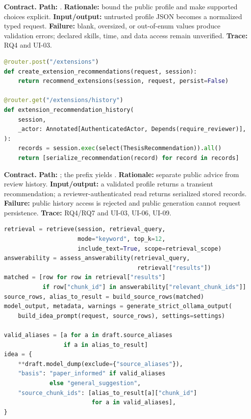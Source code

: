 \noindent\textbf{Contract.} \textbf{Path:} . \textbf{Rationale:} bound the public profile and make supported choices explicit. \textbf{Input/output:} untrusted profile JSON becomes a normalized typed request. \textbf{Failure:} blank, oversized, or out-of-enum values produce validation errors; declared skills, time, and data access remain unverified. \textbf{Trace:} RQ4 and UI-03.

\begin{lstlisting}[language=Python,basicstyle=\ttfamily\footnotesize,caption={Abridged recommendation route boundary.}]
@router.post("/extensions")
def create_extension_recommendations(request, session):
    return recommend_extensions(session, request, persist=False)

@router.get("/extensions/history")
def extension_recommendation_history(
    session,
    _actor: Annotated[AuthenticatedActor, Depends(require_reviewer)],
):
    records = session.exec(select(ThesisRecommendation)).all()
    return [serialize_recommendation(record) for record in records]
\end{lstlisting}

\noindent\textbf{Contract.} \textbf{Path:} ; the prefix yields . \textbf{Rationale:} separate public advice from review history. \textbf{Input/output:} a validated profile returns a transient recommendation; a reviewer-authenticated read returns serialized stored records. \textbf{Failure:} public history access is rejected and public generation cannot request persistence. \textbf{Trace:} RQ4/RQ7 and UI-03, UI-06, UI-09.

\begin{lstlisting}[language=Python,basicstyle=\ttfamily\footnotesize,caption={Abridged source-aware Idea Generator orchestration.}]
retrieval = retrieve(session, retrieval_query,
                     mode="keyword", top_k=12,
                     include_text=True, scope=retrieval_scope)
answerability = assess_answerability(retrieval_query,
                                      retrieval["results"])
matched = [row for row in retrieval["results"]
           if row["chunk_id"] in answerability["relevant_chunk_ids"]]
source_rows, alias_to_result = build_source_rows(matched)
model_output, metadata, warnings = generate_strict_ollama_output(
    build_idea_prompt(request, source_rows), settings=settings)

valid_aliases = [a for a in draft.source_aliases
                 if a in alias_to_result]
idea = {
    **draft.model_dump(exclude={"source_aliases"}),
    "basis": "paper_informed" if valid_aliases
             else "general_suggestion",
    "source_chunk_ids": [alias_to_result[a]["chunk_id"]
                         for a in valid_aliases],
}
\end{lstlisting}

